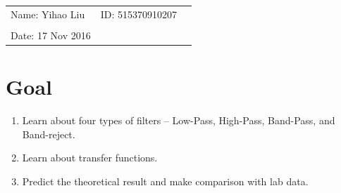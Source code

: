 \documentclass{article}
\begin{document}
\vspace*{0.25cm}

\hrulefill

\thispagestyle{empty}

\begin{center}
\begin{large}
\end{large}

\hrulefill

\vspace*{5cm}
\begin{Large}
\end{Large}

\vspace{2em}

\begin{large}
\end{large}
\end{center}


\vfill

\begin{table}[h!]
\flushleft
\begin{tabular}{lll}
Name: Yihao Liu \hspace*{2em}&
ID: 515370910207\hspace*{2em}\\


\\

Date: 17 Nov 2016 

\end{tabular}
\end{table}

\hfill
\begin{tiny}
[rev. 1.0]
\end{tiny}
\newpage


\section{Goal}
\begin{enumerate}
\item
Learn about four types of filters – Low-Pass, High-Pass, Band-Pass, and Band-reject.
\item
Learn about transfer functions.
\item
Predict the theoretical result and make comparison with lab data.
\end{enumerate}
\end{document}
